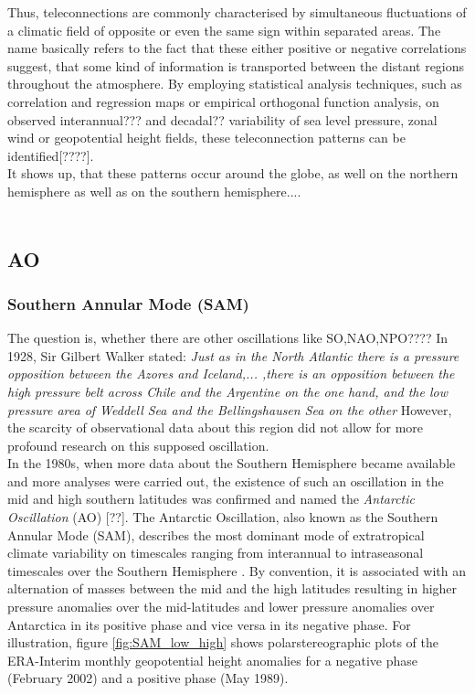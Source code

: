   Thus, teleconnections are commonly characterised by simultaneous fluctuations of a climatic field of opposite or even the same sign within separated areas. The name basically refers to the fact that these either positive or negative correlations suggest, that some kind of information is transported between the distant regions throughout the atmosphere. By employing statistical analysis techniques, such as correlation and regression maps or empirical orthogonal function analysis, on  observed interannual??? and decadal?? variability of sea level pressure, zonal wind or geopotential height fields, these teleconnection patterns can be identified[????].\\
It shows up, that these patterns occur around the globe, as well on the northern hemisphere as well as on the southern hemisphere....\\\\


 






	\subsection{AO}


	\subsubsection{Southern Annular Mode (SAM)}
	The question is, whether there are other oscillations like SO,NAO,NPO????
	In 1928, Sir Gilbert Walker stated: \textit{Just as in the North Atlantic there is a pressure opposition between the Azores and Iceland,... ,there is an opposition between the high pressure belt across Chile and the Argentine on the one hand, and the low pressure area of Weddell Sea and the Bellingshausen Sea on the other} \cite{Gong1999}
	However, the scarcity of observational data about this region did not allow for more profound research on this supposed oscillation. \\
	In the 1980s, when more data about the Southern Hemisphere became available and more analyses were carried out, the existence of such an oscillation in the mid and high southern latitudes was confirmed and named the \textit{Antarctic Oscillation} (AO) [??].
	The Antarctic Oscillation, also known as the Southern Annular Mode (SAM), describes the most dominant mode of extratropical climate variability on timescales ranging from interannual to intraseasonal timescales over the Southern Hemisphere \cite{Thompson2000}. By convention, it is associated with an alternation of masses between the mid and the high latitudes resulting in higher pressure anomalies over the mid-latitudes and lower pressure anomalies over Antarctica in its positive phase and vice versa in its negative phase. For illustration, figure \ref{fig:SAM_low_high} shows polarstereographic plots of the ERA-Interim monthly geopotential height anomalies for a  negative phase (February 2002) and a positive phase (May 1989). 


